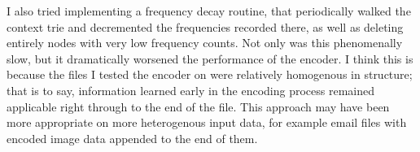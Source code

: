\documentclass[11pt]{article}
\begin{document}
I also tried implementing a frequency decay routine, that periodically walked the context trie and decremented the frequencies recorded there, as well as deleting entirely nodes with very low frequency counts. Not only was this phenomenally slow, but it dramatically worsened the performance of the encoder. I think this is because the files I tested the encoder on were relatively homogenous in structure; that is to say, information learned early in the encoding process remained applicable right through to the end of the file. This approach may have been more appropriate on more heterogenous input data, for example email files with encoded image data appended to the end of them.

\printbibliography
\end{document}

